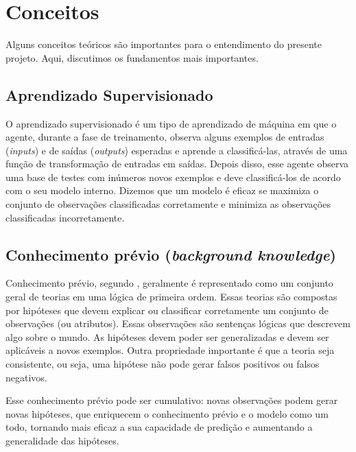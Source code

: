 \chapter{Conceitos}
\label{cap:conceitos}

Alguns conceitos teóricos são importantes para o entendimento do presente projeto. Aqui, discutimos os fundamentos mais importantes.

\section{Aprendizado Supervisionado}
\label{sec:fundamentos}

O aprendizado supervisionado é um tipo de aprendizado de máquina em que o agente, durante a fase de treinamento, observa alguns exemplos de entradas (\textit{inputs}) e de saídas (\textit{outputs}) esperadas e aprende a classificá-las, através de uma função de transformação de entradas em saídas. Depois disso, esse agente observa uma base de testes com inúmeros novos exemplos e deve classificá-los de acordo com o seu modelo interno. Dizemos que um modelo é eficaz se maximiza o conjunto de observações classificadas corretamente e minimiza as observações classificadas incorretamente.

\section{Conhecimento prévio (\textit{background knowledge})}
\label{sec:fundamentos}

Conhecimento prévio, segundo \citet[capítulo 19]{AIMA}, geralmente é representado como um conjunto geral de teorias em uma lógica de primeira ordem. Essas teorias são compostas por hipóteses que devem explicar ou classificar corretamente um conjunto de observações (ou atributos). Essas observações são sentenças lógicas que descrevem algo sobre o mundo. As hipóteses devem poder ser generalizadas e devem ser aplicáveis a novos exemplos. Outra propriedade importante é que a teoria seja consistente, ou seja, uma hipótese não pode gerar falsos positivos ou falsos negativos.

Esse conhecimento prévio pode ser cumulativo: novas observações podem gerar novas hipóteses, que enriquecem o conhecimento prévio e o modelo como um todo, tornando mais eficaz a sua capacidade de predição e aumentando a generalidade das hipóteses.

